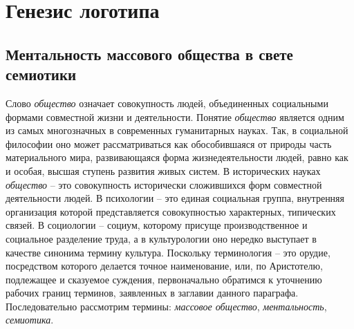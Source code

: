 \section{Генезис логотипа}\label{chapter1}

\subsection{Ментальность массового общества в свете семиотики}\label{1}
Слово \emph{общество} означает совокупность людей, объединенных социальными формами
совместной жизни и деятельности. Понятие \emph{общество} является одним из самых многозначных в
современных гуманитарных науках. Так, в социальной философии оно может рассматриваться как обособившаяся
от природы часть материального мира, развивающаяся форма жизнедеятельности людей,
равно как и особая, высшая ступень развития живых систем. В исторических науках \emph{общество}
-- это совокупность исторически сложившихся форм совместной деятельности людей.
В психологии -- это единая социальная группа, внутренняя организация которой представляется
совокупностью характерных, типических связей. В социологии -- социум, которому присуще
производственное и социальное разделение труда, а в культурологии оно нередко выступает в
качестве синонима термину культура. Поскольку терминология -- это орудие, посредством
которого делается точное наименование, или, по Аристотелю, подлежащее и сказуемое суждения,
первоначально обратимся к уточнению рабочих границ терминов, заявленных в заглавии данного
параграфа. Последовательно рассмотрим термины: \emph{массовое общество}, \emph{ментальность},
\emph{семиотика}.\autocite{society}


